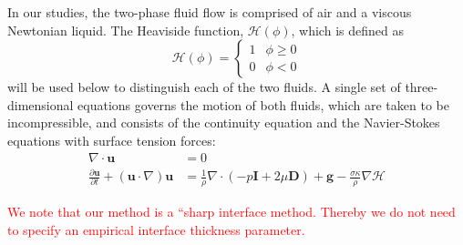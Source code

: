 \documentclass{elsarticle}
\newcommand{\Hea}{\mathcal{H}}
\newcommand{\vv}{\mathbf}
\newcommand{\bmD}{\vv{D}}
\newcommand{\bmg}{\vv{g}}
\newcommand{\bmI}{\vv{I}}
\newcommand{\bmu}{\vv{u}}
\begin{document}
\par 
In our studies, the two-phase fluid flow is comprised of air and a viscous Newtonian liquid.  The Heaviside function, $\Hea(\phi)$, which is defined as
\begin{equation}\label{heavyeqn}
  \Hea(\phi) = \begin{cases}
               1 & \phi \geq 0 \\
               0 & \phi <0 
               \end{cases}
\end{equation}
will be used below to distinguish each of the two fluids.  A single set of
three-dimensional equations governs the motion of both fluids, which are taken
to be incompressible, and consists of the continuity equation and the
Navier-Stokes equations with surface tension forces:
\begin{align}
  \nabla\cdot\bmu &=0  \label{divu} \\
  \frac{\partial\bmu}{\partial t}+(\bmu\cdot\nabla)\bmu &=
  \frac{1}{\rho}\nabla\cdot(-p\bmI+2\mu\bmD)+\bmg-
  \frac{\sigma\kappa}{\rho}\nabla \Hea  
  \label{nseqn}
\end{align}

\textcolor{red}
{
	We note that our method is a ``sharp interface method\cite{SusSmiHusOhtZhi07,Sus03,KanFedLiu00}.  Thereby we do not need to specify an empirical interface thickness parameter\cite{SusSmeOsh94,SusPuc00}.
}
\end{document}
